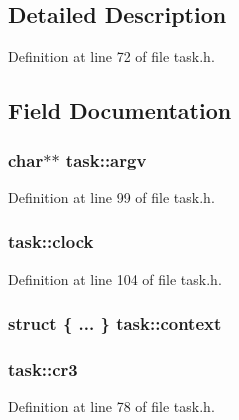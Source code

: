 \subsection{Detailed Description}


Definition at line 72 of file task.\+h.



\subsection{Field Documentation}
\hypertarget{structtask_a91e7540d20695c7439f7d0755a7a0545}{
\subsubsection[{argv}]{\setlength{\rightskip}{0pt plus 5cm}char$\ast$$\ast$ task\+::argv}}\label{structtask_a91e7540d20695c7439f7d0755a7a0545}


Definition at line 99 of file task.\+h.

\hypertarget{structtask_a8a31c6648c1b1869bfa069f4a969b0ad}{
\subsubsection[{clock}]{ task\+::clock}}\label{structtask_a8a31c6648c1b1869bfa069f4a969b0ad}


Definition at line 104 of file task.\+h.

\hypertarget{structtask_a7e47fc3627188eeefc77f78e8d36ddd1}{
\subsubsection[{context}]{\setlength{\rightskip}{0pt plus 5cm}struct \{ ... \}   task\+::context}}\label{structtask_a7e47fc3627188eeefc77f78e8d36ddd1}
\hypertarget{structtask_a5f4968459d4640f19c7e802ae7057179}{
\subsubsection[{cr3}]{ task\+::cr3}}\label{structtask_a5f4968459d4640f19c7e802ae7057179}


Definition at line 78 of file task.\+h.

